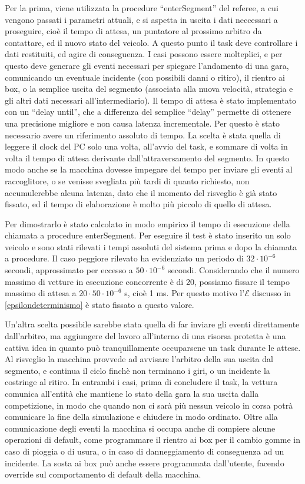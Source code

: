 Per la prima, viene utilizzata la procedure “enterSegment” del referee, a cui vengono passati i parametri attuali, e si aspetta in uscita i dati neccessari a proseguire, cioè il tempo di attesa, un puntatore al prossimo arbitro da contattare, ed il nuovo stato del veicolo.
A questo punto il task deve controllare i dati restituiti, ed agire di conseguenza. I casi possono essere molteplici, e per questo deve generare gli eventi necessari per spiegare l’andamento di una gara, comunicando un eventuale incidente (con possibili danni o ritiro), il rientro ai box, o la semplice uscita del segmento (associata alla nuova velocità, strategia e gli altri dati necessari all’intermediario).
Il tempo di attesa è stato implementato con un “delay until”, che a differenza del semplice “delay” permette di ottenere una precisione migliore e non causa latenza incrementale. Per questo è stato necessario avere un riferimento assoluto di tempo. La scelta è stata quella di leggere il clock del PC solo una volta, all’avvio del task, e sommare di volta in volta il tempo di attesa derivante dall’attraversamento del segmento.
In questo modo anche se la macchina dovesse impegare del tempo per inviare gli eventi al raccoglitore, o se venisse svegliata più tardi di quanto richiesto, non accumulerebbe alcuna latenza, dato che il momento del risveglio è già stato fissato, ed il tempo di elaborazione è molto più piccolo di quello di attesa.

Per dimostrarlo è stato calcolato in modo empirico il tempo di esecuzione della chiamata a procedure enterSegment. Per eseguire il test è stato inserito un solo veicolo e sono stati rilevati i tempi assoluti del sistema prima e dopo la chiamata a procedure. Il caso peggiore rilevato ha evidenziato un periodo di $32 \cdot 10^{-6}$ secondi, approssimato per eccesso a $50 \cdot 10^{-6}$ secondi. Considerando che il numero massimo di vetture in esecuzione concorrente è di 20, possiamo fissare il tempo massimo di attesa a $20 \cdot 50 \cdot 10^{-6}$ s, cioè 1 ms. Per questo motivo l'$\mathcal{E}$ discusso in \ref{epsilondeterminismo} è stato fissato a questo valore.

Un’altra scelta possibile sarebbe stata quella di far inviare gli eventi direttamente dall’arbitro, ma aggiungere del lavoro all’interno di una risorsa protetta è una cattiva idea in quanto può tranquillamente occuparsene un task durante le attese.
Al risveglio la macchina provvede ad avvisare l’arbitro della sua uscita dal segmento, e continua il ciclo finchè non terminano i giri, o un incidente la costringe al ritiro. In entrambi i casi, prima di concludere il task, la vettura comunica all’entità che mantiene lo stato della gara la sua uscita dalla competizione, in modo che quando non ci sarà più nessun veicolo in corsa potrà comunicare la fine della simulazione e chiudere in modo ordinato.
Oltre alla comunicazione degli eventi la macchina si occupa anche di compiere alcune operazioni di default, come programmare il rientro ai box per il cambio gomme in caso di pioggia o di usura, o in caso di danneggiamento di conseguenza ad un incidente. La sosta ai box può anche essere programmata dall’utente, facendo override sul comportamento di default della macchina.

